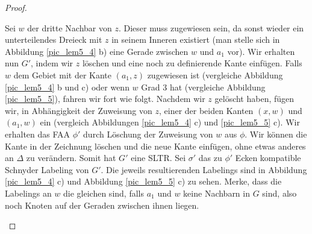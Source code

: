 \begin{proof}
\begin{description}[leftmargin =0pt, font = \rmfamily ,listparindent=\parindent,parsep=0pt]
Sei $w$ der dritte Nachbar von $z$. Dieser muss zugewiesen sein, da sonst wieder ein unterteilendes Dreieck mit $z$ in seinem Inneren existiert (man stelle sich in Abbildung \ref{pic_lem5_4} b) eine Gerade zwischen $w$ und $a_1$ vor). Wir erhalten nun $G'$, indem wir $z$ löschen und eine noch zu definierende Kante einfügen. Falls $w$ dem Gebiet mit der Kante $(a_1,z)$ zugewiesen ist (vergleiche Abbildung \ref{pic_lem5_4} b und c) oder wenn $w$ Grad 3 hat (vergleiche Abbildung \ref{pic_lem5_5}), fahren wir fort wie folgt. Nachdem wir $z$ gelöscht haben, fügen wir, in Abhängigkeit der Zuweisung von $z$, einer der beiden Kanten $(x,w)$ und $(a_1,w)$ ein (vergleich Abbildungen \ref{pic_lem5_4} c) und \ref{pic_lem5_5} c). Wir erhalten das FAA $\phi'$ durch Löschung der Zuweisung von $w$ aus $\phi$. Wir können die Kante in der Zeichnung löschen und die neue Kante einfügen, ohne etwas anderes an $\Delta$ zu verändern. Somit hat $G'$ eine SLTR. Sei $\sigma'$ das zu $\phi'$ Ecken kompatible Schnyder Labeling von $G'$. Die jeweils resultierenden Labelings sind in Abbildung \ref{pic_lem5_4} c) und Abbildung \ref{pic_lem5_5} c) zu sehen. Merke, dass die Labelings an $w$ die gleichen sind, falls $a_1$ und $w$ keine Nachbarn in $G$ sind, also noch Knoten auf der Geraden zwischen ihnen liegen.


\end{description}
\end{proof}
